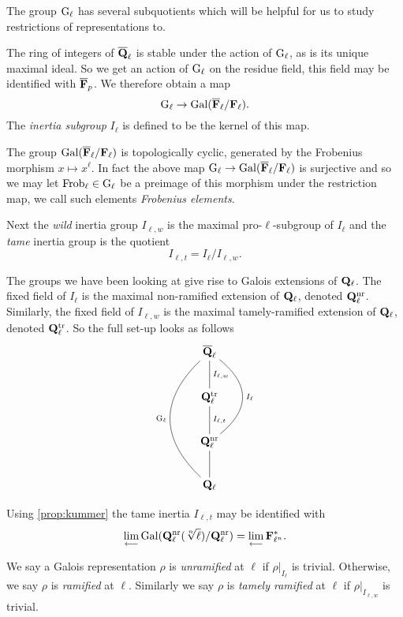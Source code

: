 \documentclass[a4paper,12pt]{article}
\begin{document}
The group $\mathrm{G}_\ell$ has several subquotients which will be helpful for us to study restrictions of representations to.
\begin{defn}\label{def:inert}
The ring of integers of $\overline{\mathbf{Q}}_\ell$ is stable under the action of $\mathrm{G}_\ell$, as is its unique maximal ideal.
So we get an action of $\mathrm{G}_\ell$ on the residue field, this field may be identified with $\overline{\mathbf{F}}_p$.
We therefore obtain a map
\[
\mathrm{G}_\ell \to \operatorname{Gal}(\overline{\mathbf{F}}_\ell/\mathbf{F}_\ell).
\]
The \emph{inertia subgroup} $I_\ell$ is defined to be the kernel of this map.

The group $\operatorname{Gal}(\overline{\mathbf{F}}_\ell/\mathbf{F}_\ell)$ is topologically cyclic, generated by the Frobenius morphism $x \mapsto x^\ell$.
In fact the above map $\mathrm{G}_\ell \to \operatorname{Gal}(\overline{\mathbf{F}}_\ell/\mathbf{F}_\ell)$ is surjective and so we may let $\operatorname{Frob}_\ell\in \mathrm{G}_\ell$ be a preimage of this morphism under the restriction map, we call such elements \emph{Frobenius elements}.



Next the \emph{wild} inertia group $I_{\ell,w}$ is the maximal pro-$\ell$-subgroup of $I_\ell$ and the \emph{tame} inertia group is the quotient
\[
I_{\ell,t} = I_\ell / I_{\ell,w}.
\]
\end{defn}


The groups we have been looking at give rise to Galois extensions of $\mathbf{Q}_\ell$.
The fixed field of $I_\ell$ is the maximal non-ramified extension of $\mathbf{Q}_\ell$, denoted $\mathbf{Q}_\ell^{\mathrm{nr}}$.
Similarly, the fixed field of $I_{\ell,w}$ is the maximal tamely-ramified extension of $\mathbf{Q}_\ell$, denoted $\mathbf{Q}_\ell^{\mathrm{tr}}$. %
So the full set-up looks as follows
\[
\xymatrix{
\Qlb      \ar@{-}[d]^{I_{\ell,w}} \ar@{-}@/_3pc/[ddd]_{\Gl} \ar@{-}@/^2.5pc/[dd]^{I_{\ell}}\\
\Ql^\tamr \ar@{-}[d]^{I_{\ell,t}} \\
\Ql^\nr   \ar@{-}[d] \\
\Ql
}
\]

Using \cref{prop:kummer} the tame inertia $I_{\ell,t}$ may be identified with
\[
\lim_{\longleftarrow} \Gal(\Ql^\nr(\sqrt[n]{\ell})/\Ql^\nr)= \lim_{\longleftarrow} \FF_{\ell^n}^*. %
\]

\begin{defn}
We say a Galois representation $\rho$ is \emph{unramified} at $\ell$ if $\rho|_{I_\ell}$ is trivial.
Otherwise, we say $\rho$ is \emph{ramified} at $\ell$.
Similarly we say $\rho$ is \emph{tamely ramified} at $\ell$ if $\rho|_{I_{\ell,w}}$ is trivial.
\end{defn}
\end{document}
